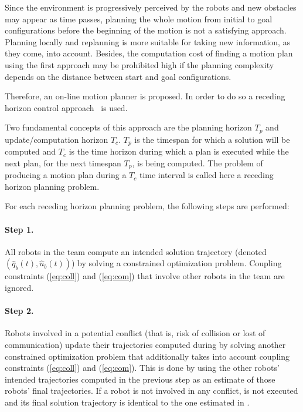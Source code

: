 \documentclass[eprint]{actapoly}
\begin{document}
Since the environment is progressively perceived by the robots and new obstacles may 
appear as time passes,
planning the whole motion from initial to goal configurations before the beginning
of the motion is
not a satisfying approach. Planning locally and replanning is 
more suitable for taking new information, as they come, into account. Besides, the computation cost of finding a motion plan using
the first approach may be prohibited high if the planning complexity depends
on the distance between start and goal configurations.

Therefore, an on-line motion planner 
is proposed.
In order to do so a receding horizon control approach~\cite{Keviczky2006} is used.

Two fundamental concepts of this approach are the planning horizon $T_p$ and 
update/computation horizon $T_c$. $T_p$ is the timespan for which a solution 
will be computed and
$T_c$ is the time horizon during which a plan is executed while the
next plan, for the next timespan $T_p$, is being computed.
The problem of producing a motion plan during a $T_c$ time interval is called
here a receding horizon planning problem.

For each receding horizon planning problem, the following steps are performed:
\paragraph{Step 1.}\label{step1} All robots in the team compute an intended solution trajectory (denoted $(\hat{q}_b(t), \hat{u}_b(t))$)
by solving a constrained optimization problem. Coupling
constraints (\ref{eq:coll}) and (\ref{eq:com}) that involve 
other robots in the team are ignored.
\paragraph{Step 2.}\label{step2} Robots involved in a potential conflict (that is, risk of collision 
or lost of communication) update their trajectories computed during  by solving another constrained optimization problem
that additionally takes into account
coupling constraints (\ref{eq:coll}) and (\ref{eq:com}).
This is done by using the other robots' intended
trajectories computed in the previous step as an estimate of those robots'
final trajectories. If a robot is not involved in any conflict, 
is not executed and its final
solution trajectory is identical to the one estimated in .
\end{document}
